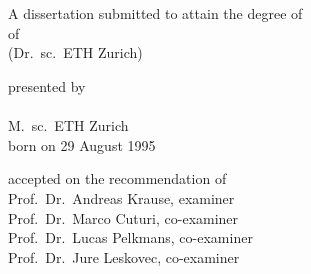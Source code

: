 \begin{titlepage}
    \begin{center}
        \large
        \begingroup
        \endgroup

        \hfill

        \vfill

        \begingroup
            \spacedallcaps{\myTitle}\\
            \vspace{5pt}\spacedallcaps{\footnotesize \mySubtitle}\\
        \endgroup

        \vfill

        \begingroup
            A dissertation submitted to attain the degree of\\
            \vspace{0.5em}
            of
             \\
            (Dr.\ sc.\ ETH Zurich)
        \endgroup

        \vfill

        \begingroup
            presented by\\
            \vspace{0.5em}
            \spacedallcaps{\normalsize \myName} \\
            M.\ sc.\ ETH Zurich \\
            \vspace{0.5em}
            born on 29 August 1995\\
        \endgroup

        \vfill

        \begingroup
            accepted on the recommendation of\\
            \vspace{0.5em}
            Prof.\ Dr.\ Andreas Krause, examiner \\
            Prof.\ Dr.\ Marco Cuturi, co-examiner \\
            Prof.\ Dr.\ Lucas Pelkmans, co-examiner \\
            Prof.\ Dr.\ Jure Leskovec, co-examiner \\
        \endgroup

        \vfill

        \myTime%

        \vfill
    \end{center}
\end{titlepage}
